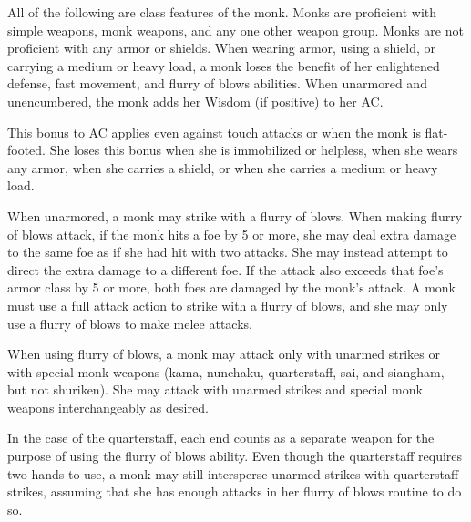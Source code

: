 All of the following are class features of the monk.
Monks are proficient with simple weapons, monk weapons,  and any one other weapon group.  Monks are not proficient with any armor or shields. When wearing armor, using a shield, or carrying a medium or heavy load, a monk loses the benefit of her  enlightened defense,  fast movement, and flurry of blows abilities.
   When unarmored and unencumbered, the monk adds her Wisdom (if positive) to her AC.

\par This bonus to AC applies even against touch attacks or when the monk is flat-footed. She loses this bonus when she is immobilized or helpless, when she wears any armor, when she carries a shield, or when she carries a medium or heavy load.

\begin{comment}    %
 \cfnl{\Ki Ward (Ex)}\label{Mnk:Ki Ward (Ex)} When unarmored and unencumbered, a monk gains a \plus1 armor bonus to AC at 2nd level. This bonus increases by 1 for every two monk levels thereafter (\plus2 at 4th, \plus3 at 6th, etc.).

\par The monk loses this bonus when she is
immobilized or helpless, when she wears any armor, when she carries a shield, or when she carries a medium or heavy load.
\end{comment}

   When unarmored, a monk may strike with a flurry of blows. When making flurry of blows attack, if the monk hits a foe by 5 or more, she may deal extra damage to the same foe as if she had hit with two attacks. She may instead attempt to direct the extra damage to a different foe. If the attack also exceeds that foe's armor class by 5 or more, both foes are damaged by the monk's attack. A monk must use a full attack action to strike with a flurry of blows, and she may only use a flurry of blows to make melee attacks.

\par When using flurry of blows, a monk may attack only with unarmed strikes or with special monk weapons (kama, nunchaku, quarterstaff, sai, and siangham, but not shuriken). She may attack with unarmed strikes and special monk weapons interchangeably as desired.

In the case of the quarterstaff, each end counts as a separate weapon for the purpose of using the flurry of blows ability. Even though the quarterstaff requires two hands to use, a monk may still intersperse unarmed strikes with quarterstaff strikes, assuming that she has enough attacks in her flurry of blows routine to do so.

